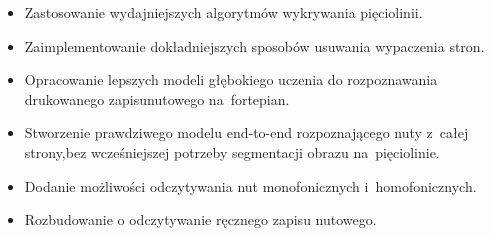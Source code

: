 \documentclass[xodstep]{wnspt}
\begin{document}
\begin{itemize}
	\item Zastosowanie wydajniejszych algorytmów wykrywania pięciolinii.
	\item Zaimplementowanie dokładniejszych sposobów usuwania wypaczenia stron.
	\item Opracowanie lepszych modeli głębokiego uczenia do rozpoznawania drukowanego zapisu\linebreak nutowego na~fortepian.
	\item Stworzenie prawdziwego modelu end-to-end rozpoznającego nuty z~całej strony,\linebreak bez wcześniejszej potrzeby segmentacji obrazu na~pięciolinie.
	\item Dodanie możliwości odczytywania nut monofonicznych i~homofonicznych.
	\item Rozbudowanie o odczytywanie ręcznego zapisu nutowego.
\end{itemize}

\nocite{*}
\printbibheading
\printbibliography[type=book, heading=subbibliography, title={Książki}]
\printbibliography[type=article, heading=subbibliography, title={Artykuły}]
\printbibliography[type=inproceedings, heading=subbibliography, title={Materiały konferencyjne}]
\printbibliography[type=online, heading=subbibliography, title={Strony internetowe}]

\listoftables

\listoffigures

\lstlistoflistings
\end{document}
